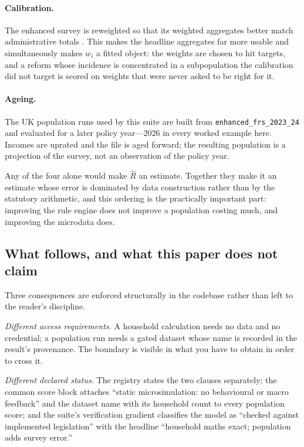 \paragraph{Calibration.} The enhanced survey is reweighted so that its weighted aggregates better match administrative totals \citep{deville1992}. This makes the headline aggregates far more usable and simultaneously makes $w_i$ a fitted object: the weights are chosen to hit targets, and a reform whose incidence is concentrated in a subpopulation the calibration did not target is scored on weights that were never asked to be right for it.

\paragraph{Ageing.} The UK population runs used by this suite are built from \texttt{enhanced\_frs\_2023\_24} and evaluated for a later policy year---2026 in every worked example here. Incomes are uprated and the file is aged forward; the resulting population is a projection of the survey, not an observation of the policy year.

Any of the four alone would make $\widehat{R}$ an estimate. Together they make it an estimate whose error is dominated by data construction rather than by the statutory arithmetic, and this ordering is the practically important part: improving the rule engine does not improve a population costing much, and improving the microdata does.

\subsection{What follows, and what this paper does not claim}

Three consequences are enforced structurally in the codebase rather than left to the reader's discipline.

\emph{Different access requirements.} A household calculation needs no data and no credential; a population run needs a gated dataset whose name is recorded in the result's provenance. The boundary is visible in what you have to obtain in order to cross it.

\emph{Different declared status.} The registry states the two clauses separately; the common score block attaches ``static microsimulation: no behavioural or macro feedback'' and the dataset name with its household count to every population score; and the suite's verification gradient classifies the model as ``checked against implemented legislation'' with the headline ``household maths exact; population adds survey error.''

